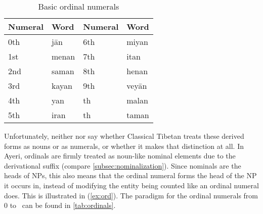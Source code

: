 \begin{table}\centering
\caption{Basic ordinal numerals}
\begin{tabu} to .75\linewidth {X I X I}
\toprule\tableheaderfont
Numeral
	& Word
	& Numeral
	& Word
	\\
\toprule

0th
	& jān %
	& 6th
	& miyan %
	\\

1st
	& menan %
	& 7th
	& itan %
	\\
	
2nd
	& saman %
	& 8th
	& henan %
	\\
	
3rd
	& kayan %
	& 9th
	& veyān %
	\\

4th
	& yan %
	& \ten{}th
	& malan %
	\\

5th
	& iran %
	& \elv{}th
	& taman %
	\\

\bottomrule
\end{tabu}
\label{tab:ordinals}
\end{table}

Unfortunately, neither \citet{chungetal2014} nor \citet{beyer1992} say whether
Classical Tibetan treats these derived forms as nouns or as numerals, or
whether it makes that distinction at all. In Ayeri, ordinals are firmly treated
as noun-like nominal elements due to the derivational suffix
 (compare \autoref{subsec:nominalization}). Since nominals are
the heads of NPs, this also means that the ordinal numeral forms the head of
the NP it occurs in, instead of modifying the entity being counted like an
ordinal numeral does. This is illustrated in (\ref{ex:ord}). The paradigm for
the ordinal numerals from 0 to \elv\ can be found in \autoref{tab:ordinals}.

